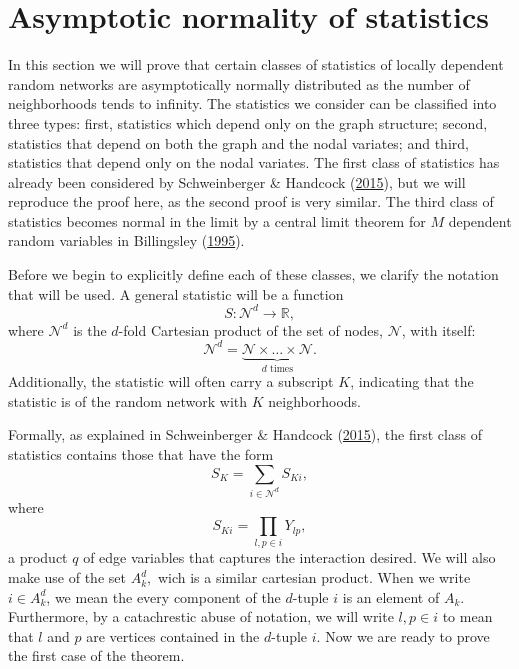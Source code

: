 \documentclass[12pt,twoside]{reedthesis}
\theoremstyle{definition}
\theoremstyle{definition}
\theoremstyle{remark}
\begin{document}
\section{Asymptotic normality of
statistics}\label{asymptotic-normality-of-statistics}

In this section we will prove that certain classes of statistics of
locally dependent random networks are asymptotically normally
distributed as the number of neighborhoods tends to infinity. The
statistics we consider can be classified into three types: first,
statistics which depend only on the graph structure; second, statistics
that depend on both the graph and the nodal variates; and third,
statistics that depend only on the nodal variates. The first class of
statistics has already been considered by Schweinberger \& Handcock
(\protect\hyperlink{ref-Schweinberger2015}{2015}), but we will reproduce
the proof here, as the second proof is very similar. The third class of
statistics becomes normal in the limit by a central limit theorem for
\(M\) dependent random variables in Billingsley
(\protect\hyperlink{ref-Billingsley1995}{1995}).

Before we begin to explicitly define each of these classes, we clarify
the notation that will be used. A general statistic will be a function
\begin{equation*}
S:\mathcal{N}^d \to \mathbb{R},
\end{equation*}
where \(\mathcal{N}^d\) is the \(d\)-fold Cartesian product of the set
of nodes, \(\mathcal{N}\), with itself:
\begin{equation*}
\mathcal{N}^d = \underbrace{\mathcal{N} \times \dots \times \mathcal{N}}_{d \text{ times}}.
\end{equation*}
Additionally, the statistic will often carry a subscript \(K\),
indicating that the statistic is of the random network with \(K\)
neighborhoods.

Formally, as explained in Schweinberger \& Handcock
(\protect\hyperlink{ref-Schweinberger2015}{2015}), the first class of
statistics contains those that have the form
\begin{equation*}
S_{K} = \sum_{i \in \mathcal{N}^d} S_{Ki},
\end{equation*}
where
\begin{equation*}
S_{Ki} = \prod_{l, p \in i} Y_{lp}, 
\end{equation*}
a product \(q\) of edge variables that captures the interaction desired.
We will also make use of the set \(A_k^d,\) wich is a similar cartesian
product. When we write \(i \in A_k^d\), we mean the every component of
the \(d\)-tuple \(i\) is an element of \(A_k\). Furthermore, by a
catachrestic abuse of notation, we will write \(l, p \in i\) to mean
that \(l\) and \(p\) are vertices contained in the \(d\)-tuple \(i\).
Now we are ready to prove the first case of the theorem.
\end{document}

